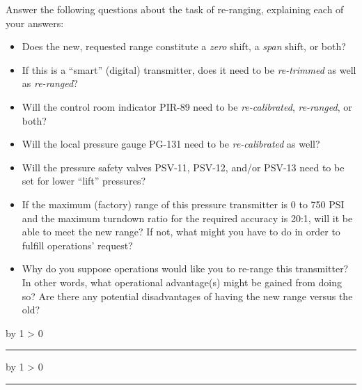 \documentclass[12pt,a4paper]{article}
\def\svar{
           \advance\answnum by 1
           \ifnum \answnum > 0
                \hrule
                \vskip 3pt
                \leftline{Svar \the\answnum}
                \vskip 3pt \fi}
\def\notes{
           \advance\explnum by 1
           \ifnum \explnum > 0
                \hrule
                \vskip 3pt
                \leftline{Notes \the\explnum}
                \vskip 3pt \fi}
\begin{document}
Answer the following questions about the task of re-ranging, explaining each of your answers:

\begin{itemize}
\item{} Does the new, requested range constitute a {\it zero} shift, a {\it span} shift, or both?
\vskip 10pt
\item{} If this is a ``smart'' (digital) transmitter, does it need to be {\it re-trimmed} as well as {\it re-ranged}?
\vskip 10pt
\item{} Will the control room indicator PIR-89 need to be {\it re-calibrated}, {\it re-ranged}, or both?
\vskip 10pt
\item{} Will the local pressure gauge PG-131 need to be {\it re-calibrated} as well?
\vskip 10pt
\item{} Will the pressure safety valves PSV-11, PSV-12, and/or PSV-13 need to be set for lower ``lift'' pressures?
\vskip 10pt
\item{} If the maximum (factory) range of this pressure transmitter is 0 to 750 PSI and the maximum turndown ratio for the required accuracy is 20:1, will it be able to meet the new range?  If not, what might you have to do in order to fulfill operations' request?
\vskip 10pt
\item{} Why do you suppose operations would like you to re-range this transmitter?  In other words, what operational advantage(s) might be gained from doing so?  Are there any potential disadvantages of having the new range versus the old?
\end{itemize}

\vskip 10pt \filbreak 





\svar{} 


\vskip 10pt \filbreak 





\notes{} 
\end{document}
